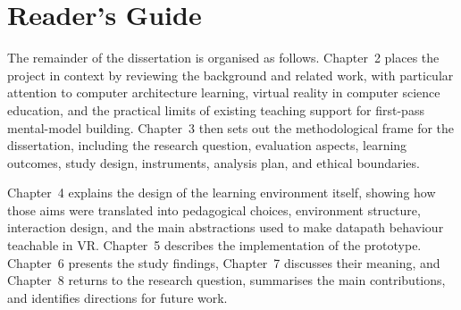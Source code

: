 \section{Reader's Guide}

The remainder of the dissertation is organised as follows. Chapter~2 places the project in context by reviewing the background and related work, with particular attention to computer architecture learning, virtual reality in computer science education, and the practical limits of existing teaching support for first-pass mental-model building. Chapter~3 then sets out the methodological frame for the dissertation, including the research question, evaluation aspects, learning outcomes, study design, instruments, analysis plan, and ethical boundaries.

Chapter~4 explains the design of the learning environment itself, showing how those aims were translated into pedagogical choices, environment structure, interaction design, and the main abstractions used to make datapath behaviour teachable in VR. Chapter~5 describes the implementation of the prototype. Chapter~6 presents the study findings, Chapter~7 discusses their meaning, and Chapter~8 returns to the research question, summarises the main contributions, and identifies directions for future work.
